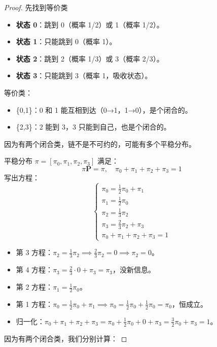 \documentclass[lang=cn,10pt,thmcnt=section]{elegantbook}
\begin{document}
\begin{proof}
先找到等价类

\begin{itemize}
    \item \textbf{状态 0}：跳到 0（概率 1/2）或 1（概率 1/2）。
    \item \textbf{状态 1}：只能跳到 0（概率 1）。
    \item \textbf{状态 2}：跳到 2（概率 1/3）或 3（概率 2/3）。
    \item \textbf{状态 3}：只能跳到 3（概率 1，吸收状态）。
\end{itemize}
等价类：
\begin{itemize}
    \item \{0,1\}：0 和 1 能互相到达（0→1，1→0），是个闭合的。
    \item \{2,3\}：2 能到 3，3 只能到自己，也是个闭合的。
\end{itemize}
因为有两个闭合类，链不是不可约的，可能有多个平稳分布。

平稳分布 \(\pi = [\pi_0, \pi_1, \pi_2, \pi_3]\) 满足：
\[
\pi \mathbf{P} = \pi, \quad \pi_0 + \pi_1 + \pi_2 + \pi_3 = 1
\]
写出方程：
\[
\begin{cases}
\pi_0 = \frac{1}{2}\pi_0 + \pi_1 \\
\pi_1 = \frac{1}{2}\pi_0 \\
\pi_2 = \frac{1}{3}\pi_2 \\
\pi_3 = \frac{2}{3}\pi_2 + \pi_3 \\
\pi_0 + \pi_1 + \pi_2 + \pi_3 = 1
\end{cases}
\]

\begin{itemize}
    \item 第 3 方程：\(\pi_2 = \frac{1}{3}\pi_2 \implies \frac{2}{3}\pi_2 = 0 \implies \pi_2 = 0\)。
    \item 第 4 方程：\(\pi_3 = \frac{2}{3}\cdot 0 + \pi_3 = \pi_3\)，没新信息。
    \item 第 2 方程：\(\pi_1 = \frac{1}{2}\pi_0\)。
    \item 第 1 方程：\(\pi_0 = \frac{1}{2}\pi_0 + \pi_1 \implies \pi_0 = \frac{1}{2}\pi_0 + \frac{1}{2}\pi_0 = \pi_0\)，恒成立。
    \item 归一化：\(\pi_0 + \pi_1 + \pi_2 + \pi_3 = \pi_0 + \frac{1}{2}\pi_0 + 0 + \pi_3 = \frac{3}{2}\pi_0 + \pi_3 = 1\)。
\end{itemize}

因为有两个闭合类，我们分别计算：


\end{proof}
\end{document}
